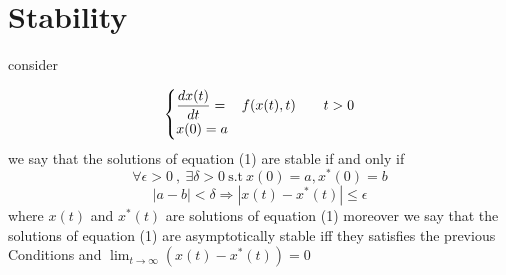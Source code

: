 \documentclass[]{article}
\begin{document}
\section{Stability}

consider 

\begin{equation}
    \begin{cases}
        \displaystyle \frac{dx(t)}{dt} = &f(x(t),t) \quad\quad t>0
        \\
        x(0) = a
    \end{cases}
\end{equation}
we say that the solutions of equation (1) are stable if and only if
\[
\forall \epsilon >0 \  , \ \exists \delta >0 \ \text{s.t} \  x(0)=a , x^*(0)=b 
\]\[
\left\lvert a-b \right\rvert < \delta \Longrightarrow  
\left\lvert x(t) - x^*(t) \right\rvert \leq \epsilon
\]
where $x(t)$ and $x^*(t)$ are solutions of equation (1) moreover we 
say that the solutions of equation (1) are asymptotically stable iff they 
satisfies the previous Conditions and $\displaystyle \lim_{t \to \infty} (x(t) - x^*(t)) = 0$
\end{document}
